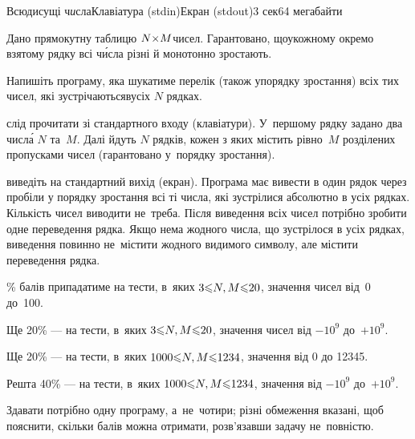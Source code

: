 \begin{problem}{Всюдисущі ч\emph{и}сла}{Клавіатура (stdin)}{Екран (stdout)}{3 сек}{64 мегабайти}

Дано прямокутну таблицю $N{\times}M$\nolinebreak[3] чисел. Гарантовано, що\nolinebreak[2] у\nolinebreak[3] кожному окремо взятому рядку всі ч\'{и}сла різні й монотонно зростають.

Напишіть програму, яка шукатиме перелік (також у\nolinebreak[3] порядку зростання) всіх тих чисел, які зустрічаються\linebreak[1] в\nolinebreak[3] усіх $N$ рядках.

\InputFile	слід прочитати зі стандартного входу (клавіатури). У~першому рядку задано два числ\'{а} $N$ та~$M$. Далі йдуть $N$ рядків, кожен з яких містить рівно~$M$ розділених пропусками чисел (гарантовано у~порядку зростання). 

\OutputFile	виведіть на стандартний вихід (екран). Програма має вивести в один рядок через пробіли у порядку зростання всі ті числа, які зустрілися абсолютно в усіх рядках. Кількість чисел виводити не~треба. Після виведення всіх чисел потрібно зробити одне переведення рядка. Якщо нема жодного числа, що зустрілося в усіх рядках, виведення повинно не~містити жодного видимого символу, але містити переведення рядка.


\Example
\begin{exampleSimple}{6em}{3em}%
%
\end{exampleSimple}

\% балів припадатиме на тести, в~яких $3{\leqslant}{N,M}{\leqslant}20$, значення чисел від~0 до~100.

Ще 20\% --- на тести, в~яких $3{\leqslant}{N,M}{\leqslant}20$, значення чисел від $-10^9$ до~$+10^9$.

Ще 20\% --- на тести, в~яких $1000{\leqslant}{N,M}{\leqslant}1234$, значення від 0 до 12345.

Решта 40\% --- на тести, в~яких $1000{\leqslant}{N,M}{\leqslant}1234$, значення від $-10^9$ до~$+10^9$.

Здавати потрібно одну програму, а~не~чотири; різні обмеження вказані, щоб пояснити, скільки балів можна отримати, розв’язавши задачу не~повністю.


\end{problem}
